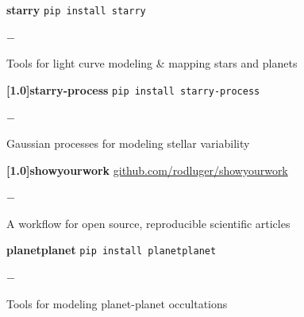 \documentclass[]{luger-cv} %
\begin{document}
    \begin{entrylist}


        \entry
        {\textbf{starry}}
        {\textnormal{\texttt{pip install starry}}}
        {}
        {%
            \vspace{-1em}
            \begin{list}{{\color{numcolor}$-$}}{\cvlist}
                \item Tools for light curve modeling \& mapping stars and planets
            \end{list}
        }


        \entry
        {\textbf{\scalebox{.85}[1.0]{starry-process}}}
        {\textnormal{\texttt{pip install starry-process}}}
        {}
        {%
            \vspace{-1em}
            \begin{list}{{\color{numcolor}$-$}}{\cvlist}
                \item Gaussian processes for modeling stellar variability
            \end{list}
        }

        
        \entry
        {\textbf{\scalebox{.85}[1.0]{showyourwork}}}
        {\textnormal{\url{github.com/rodluger/showyourwork}}}
        {}
        {%
            \vspace{-1em}
            \begin{list}{{\color{numcolor}$-$}}{\cvlist}
                \item A workflow for open source, reproducible scientific articles
            \end{list}
        }


        \entry
        {\textbf{planetplanet}}
        {\textnormal{\texttt{pip install planetplanet}}}
        {}
        {%
            \vspace{-1em}
            \begin{list}{{\color{numcolor}$-$}}{\cvlist}
                \item Tools for modeling planet-planet occultations
            \end{list}
        }


\end{entrylist}
\end{document}
